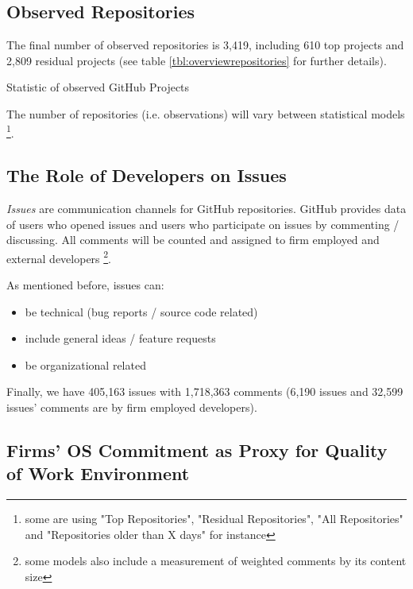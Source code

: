 \clearpage
\subsection{Observed Repositories}

The final number of observed repositories is 3,419, including 610 top projects and 2,809 residual projects (see table \ref{tbl:overviewrepositories} for further details).

\begin{table}[!ht] \centering
	\footnotesize
	
	\caption{Statistic of observed GitHub Projects}
  \label{tbl:overviewrepositories}
\end{table}

The number of repositories (i.e. observations) will vary between statistical models \footnote{some are using "Top Repositories", "Residual Repositories", "All Repositories" and "Repositories older than X days" for instance}.

\subsection{The Role of Developers on Issues}

\textit{Issues} are communication channels for GitHub repositories. GitHub provides data of users who opened issues and users who participate on issues by commenting / discussing. All comments will be counted and assigned to firm employed and external developers \footnote{some models also include a measurement of weighted comments by its content size}.

As mentioned before, issues can:

\begin{itemize}
	\item be technical (bug reports / source code related)
	\item include general ideas / feature requests
	\item be organizational related
\end{itemize}

Finally, we have 405,163 issues with 1,718,363 comments (6,190 issues and 32,599 issues' comments are by firm employed developers).

\subsection{Firms' OS Commitment as Proxy for Quality of Work Environment}

